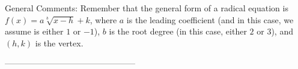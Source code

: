 \documentclass{article}[14pt]
\begin{document}
General Comments: Remember that the general form of a radical equation is $ f(x) = a \sqrt[b]{x - h} + k$, where $a$ is the leading coefficient (and in this case, we assume is either $1$ or $-1$), $b$ is the root degree (in this case, either $2$ or $3$), and $(h, k)$ is the vertex.

-----------------------------------------------
\end{document}
